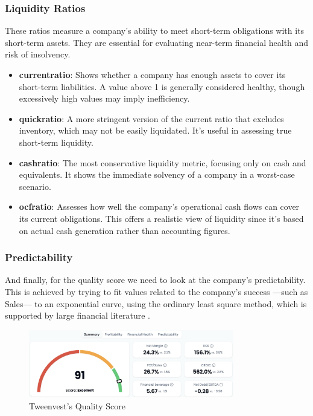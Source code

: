 \documentclass[11pt,english,a4paper,hidelinks]{book}
\begin{document}
\subsubsection{Liquidity Ratios}
These ratios measure a company's ability to meet short-term obligations with its short-term assets. They are essential for evaluating near-term financial health and risk of insolvency.

\begin{itemize}
    \item \textbf{\acrshort{currentratio}}: Shows whether a company has enough assets to cover its short-term liabilities. A value above 1 is generally considered healthy, though excessively high values may imply inefficiency.
    
    \item \textbf{\acrshort{quickratio}}: A more stringent version of the current ratio that excludes inventory, which may not be easily liquidated. It's useful in assessing true short-term liquidity.
    
    \item \textbf{\acrshort{cashratio}}: The most conservative liquidity metric, focusing only on cash and equivalents. It shows the immediate solvency of a company in a worst-case scenario.
    
    \item \textbf{\acrshort{ocfratio}}: Assesses how well the company's operational cash flows can cover its current obligations. This offers a realistic view of liquidity since it's based on actual cash generation rather than accounting figures.
\end{itemize}

\subsubsection{Predictability}

\noindent And finally, for the quality score we need to look at the company's predictability. This is achieved by trying to fit values related to the company's success —such as Sales— to an exponential curve, using the ordinary least square method, which is supported by large financial literature \cite{msci2024fundamental}.


\begin{figure}[H]
    \centering
    \includegraphics[width=0.8\textwidth]{images/tweenvest/quality score.png}
    \caption{Tweenvest's Quality Score}
    \label{fig:quality_score}
\end{figure}
\end{document}
